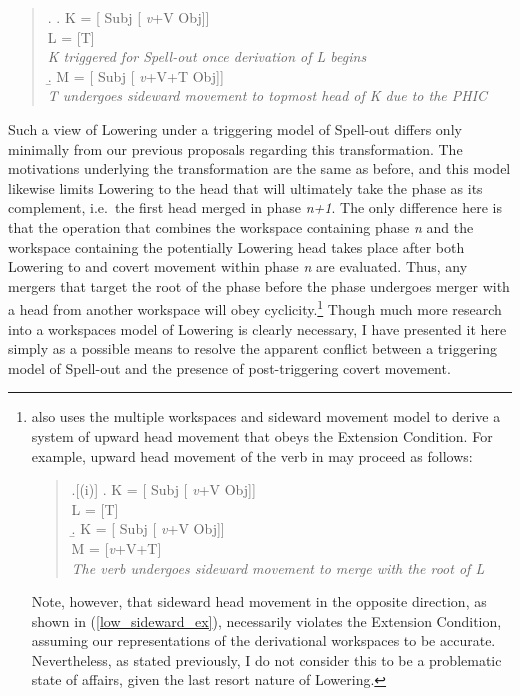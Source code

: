 \singlespacing
\begin{quote}
\ex. \label{low_sideward_ex}
\a. K = [ Subj [ {\it v}+V Obj]]\\
L = [T]\\{\it K triggered for Spell-out once derivation of L begins}\\
\b. M = [ Subj [ {\it v}+V+T Obj]]\\
{\it T undergoes sideward movement to topmost head of K due to the PHIC}\\

\end{quote}
\onehalfspacing
Such a view of Lowering under a triggering model of Spell-out differs only minimally from our previous proposals regarding this transformation. The motivations underlying the transformation are the same as before, and this model likewise limits Lowering to the head that will ultimately take the phase as its complement, i.e.\ the first head merged in phase {\it n+1}. The only difference here is that the operation that combines the workspace containing phase {\it n} and the workspace containing the potentially Lowering head takes place after both Lowering to and covert movement within phase {\it n} are evaluated. Thus, any mergers that target the root of the phase before the phase undergoes merger with a head from another workspace will obey cyclicity.\footnote{\citet{nunes2001} also uses the multiple workspaces and sideward movement model to derive a system of upward head movement that obeys the Extension Condition. For example, upward head movement of the verb in \Last may proceed as follows:

\begin{quote}
\ex.[(i)]
\a. K = [ Subj [ {\it v}+V Obj]]\\
L = [T]\\
\b. K = [ Subj [ {\it v}+V Obj]]\\
M = [{\it v}+V+T]\\{\it The verb undergoes sideward movement to merge with the root of L}\\

\end{quote}
Note, however, that sideward head movement in the opposite direction, as shown in (\ref{low_sideward_ex}), necessarily violates the Extension Condition, assuming our representations of the derivational workspaces to be accurate. Nevertheless, as stated previously, I do not consider this to be a problematic state of affairs, given the last resort nature of Lowering.} Though much more research into a workspaces model of Lowering is clearly necessary, I have presented it here simply as a possible means to resolve the apparent conflict between a triggering model of Spell-out and the presence of post-triggering covert movement.

